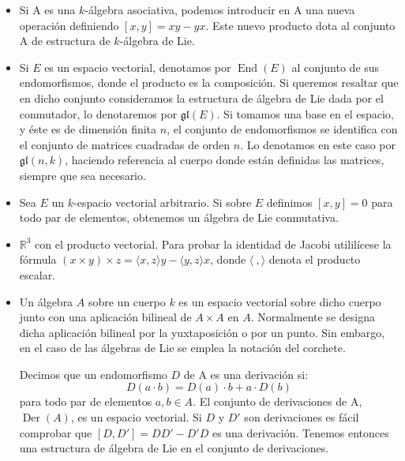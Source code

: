 \documentclass[a4paper,draft,12pt]{article}
\newcommand{\R}{\mathbb{R}}%
\newcommand{\df}[1]{\textsf{\color{blue}#1}}
\DeclareMathOperator{\End}{End}%
\DeclareMathOperator{\Der}{Der}%
\begin{document}
\newpage


\begin{itemize}

\item Si  A  es una  $k$-álgebra asociativa, podemos introducir en A una nueva operación definiendo $[x,y] = xy - yx$. Este nuevo producto dota al conjunto  A  de estructura de  $k$-álgebra de Lie. 

\item  Si $E$ es un espacio vectorial, denotamos por $\End(E)$ al conjunto de sus endomorfismos, donde el producto es la composición.  Si queremos resaltar que en dicho conjunto consideramos la estructura de álgebra de Lie dada por el conmutador, lo denotaremos por $\mathfrak{gl}(E)$.  Si tomamos una base en el espacio, y éste es de dimensión finita $n$, el conjunto de endomorfismos se identifica con el conjunto de matrices cuadradas de orden $n$.  Lo denotamos en este caso por $\mathfrak{gl}(n,k)$, haciendo referencia al cuerpo donde están definidas las matrices, siempre que sea necesario.

\item Sea $E$ un $k$-espacio vectorial arbitrario.  Si sobre $E$ definimos $[x,y]=0$ para todo par de elementos, obtenemos un álgebra de Lie conmutativa. 


\item $\R^3$ con el   \df{producto vectorial}. Para probar la identidad de Jacobi utililícese la fórmula  $(x \times y) \times z= \langle x,z\rangle y - \langle y,z\rangle x $, donde $\langle \ ,\rangle$ denota el producto escalar.

\item Un álgebra $A$ sobre un cuerpo $k$ es un espacio vectorial sobre dicho cuerpo junto con  una aplicación bilineal de $A \times A $ en $A$.  Normalmente se designa dicha aplicación bilineal por la yuxtaposición o por un punto.  Sin embargo, en el caso de las álgebras de Lie se emplea la notación del corchete.  

 Decimos que un endomorfismo  $D$  de  A  es una   \df{derivación}  si:
\[
D(a\cdot b) = D(a)\cdot b + a\cdot D(b)
\]
para todo par de elementos $a,b \in A$. El conjunto de derivaciones de A, $\Der(A)$, es un espacio vectorial. Si $D$  y  $D'$ son derivaciones es fácil comprobar que $[D,D'] = D D' - D' D$ es una derivación. Tenemos entonces una estructura de álgebra de Lie en el conjunto de derivaciones.



\end{itemize}
\end{document}
